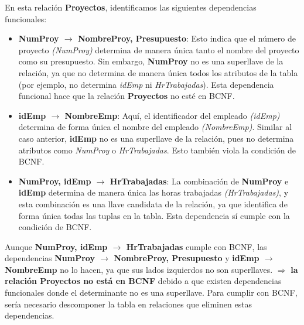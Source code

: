 \begin{itemize}
En esta relación \textbf{Proyectos}, identificamos las siguientes dependencias funcionales: \vspace{1cm}

\begin{itemize}
    \item \textbf{NumProy $\rightarrow$ NombreProy, Presupuesto}: Esto indica que el número de proyecto \textit{(NumProy)} determina de manera única tanto el nombre del proyecto como su presupuesto. Sin embargo, \textbf{NumProy} no es una superllave de la relación, ya que no determina de manera única todos los atributos de la tabla (por ejemplo, no determina \textit{idEmp} ni \textit{HrTrabajadas}). Esta dependencia funcional hace que la relación \textbf{Proyectos} no esté en BCNF. \vspace{1cm}
    
    \item \textbf{idEmp $\rightarrow$ NombreEmp}: Aquí, el identificador del empleado \textit{(idEmp)} determina de forma única el nombre del empleado \textit{(NombreEmp)}. Similar al caso anterior, \textbf{idEmp} no es una superllave de la relación, pues no determina atributos como \textit{NumProy} o \textit{HrTrabajadas}. Esto también viola la condición de BCNF. \vspace{1cm}
    
    \item \textbf{NumProy, idEmp $\rightarrow$ HrTrabajadas}: La combinación de \textbf{NumProy} e \textbf{idEmp} determina de manera única las horas trabajadas \textit{(HrTrabajadas)}, y esta combinación es una llave candidata de la relación, ya que identifica de forma única todas las tuplas en la tabla. Esta dependencia sí cumple con la condición de BCNF. \vspace{1cm}
\end{itemize}

Aunque \textbf{NumProy, idEmp $\rightarrow$ HrTrabajadas} cumple con BCNF, las dependencias \textbf{NumProy $\rightarrow$ NombreProy, Presupuesto} y \textbf{idEmp $\rightarrow$ NombreEmp} no lo hacen, ya que sus lados izquierdos no son superllaves. $\Longrightarrow$ \textbf{la relación Proyectos no está en BCNF} debido a que existen dependencias funcionales donde el determinante no es una superllave. Para cumplir con BCNF, sería necesario descomponer la tabla en relaciones que eliminen estas dependencias.  \vspace{1cm}
\vspace{1cm}

\end{itemize}


